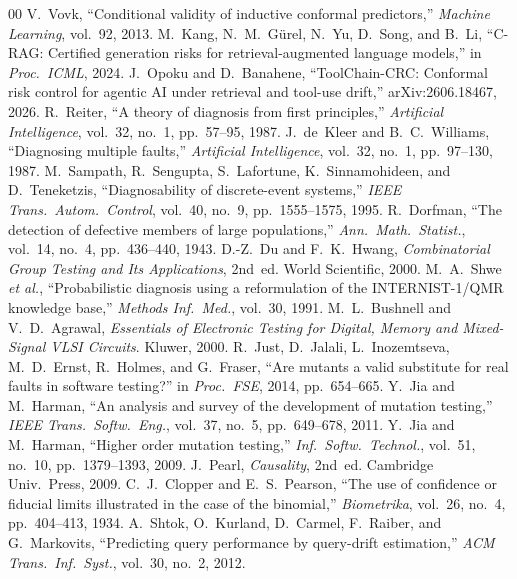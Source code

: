 \documentclass[conference]{IEEEtran}
\begin{document}
\begin{thebibliography}{00}
 V.~Vovk, ``Conditional validity of inductive conformal predictors,'' \emph{Machine Learning}, vol.~92, 2013.
 M.~Kang, N.~M.~G\"urel, N.~Yu, D.~Song, and B.~Li, ``C-RAG: Certified generation risks for retrieval-augmented language models,'' in \emph{Proc.\ ICML}, 2024.
 J.~Opoku and D.~Banahene, ``ToolChain-CRC: Conformal risk control for agentic AI under retrieval and tool-use drift,'' arXiv:2606.18467, 2026.
 R.~Reiter, ``A theory of diagnosis from first principles,'' \emph{Artificial Intelligence}, vol.~32, no.~1, pp.~57--95, 1987.
 J.~de~Kleer and B.~C.~Williams, ``Diagnosing multiple faults,'' \emph{Artificial Intelligence}, vol.~32, no.~1, pp.~97--130, 1987.
 M.~Sampath, R.~Sengupta, S.~Lafortune, K.~Sinnamohideen, and D.~Teneketzis, ``Diagnosability of discrete-event systems,'' \emph{IEEE Trans.\ Autom.\ Control}, vol.~40, no.~9, pp.~1555--1575, 1995.
 R.~Dorfman, ``The detection of defective members of large populations,'' \emph{Ann.\ Math.\ Statist.}, vol.~14, no.~4, pp.~436--440, 1943.
 D.-Z.~Du and F.~K.~Hwang, \emph{Combinatorial Group Testing and Its Applications}, 2nd~ed. World Scientific, 2000.
 M.~A.~Shwe \emph{et al.}, ``Probabilistic diagnosis using a reformulation of the INTERNIST-1/QMR knowledge base,'' \emph{Methods Inf.\ Med.}, vol.~30, 1991.
 M.~L.~Bushnell and V.~D.~Agrawal, \emph{Essentials of Electronic Testing for Digital, Memory and Mixed-Signal VLSI Circuits}. Kluwer, 2000.
 R.~Just, D.~Jalali, L.~Inozemtseva, M.~D.~Ernst, R.~Holmes, and G.~Fraser, ``Are mutants a valid substitute for real faults in software testing?'' in \emph{Proc.\ FSE}, 2014, pp.~654--665.
 Y.~Jia and M.~Harman, ``An analysis and survey of the development of mutation testing,'' \emph{IEEE Trans.\ Softw.\ Eng.}, vol.~37, no.~5, pp.~649--678, 2011.
 Y.~Jia and M.~Harman, ``Higher order mutation testing,'' \emph{Inf.\ Softw.\ Technol.}, vol.~51, no.~10, pp.~1379--1393, 2009.
 J.~Pearl, \emph{Causality}, 2nd~ed. Cambridge Univ.\ Press, 2009.
 C.~J.~Clopper and E.~S.~Pearson, ``The use of confidence or fiducial limits illustrated in the case of the binomial,'' \emph{Biometrika}, vol.~26, no.~4, pp.~404--413, 1934.
 A.~Shtok, O.~Kurland, D.~Carmel, F.~Raiber, and G.~Markovits, ``Predicting query performance by query-drift estimation,'' \emph{ACM Trans.\ Inf.\ Syst.}, vol.~30, no.~2, 2012.

\end{thebibliography}
\end{document}
